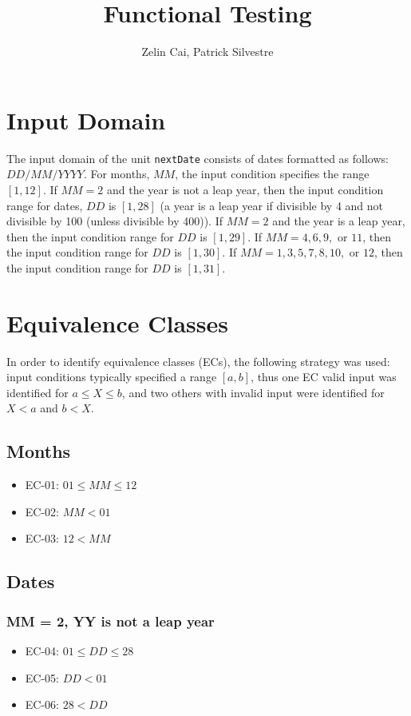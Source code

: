 \documentclass[11pt, oneside]{article}   	%
\title{Functional Testing}
\author{Zelin Cai, Patrick Silvestre}
\date{}
\begin{document}
\maketitle

\section{Input Domain}
The input domain of the unit \texttt{nextDate} consists of dates formatted as follows: $DD/MM/YYYY$. For months, $MM$, the input condition specifies the range $[1, 12]$. If $MM = 2$ and the year is not a leap year, then the input condition range for dates, $DD$ is $[1, 28]$ (a year is a leap year if divisible by 4 and not divisible by 100 (unless divisible by 400)). If $MM = 2$  and the year is a leap year, then the input condition range for $DD$ is $[1, 29]$. If $MM = 4, 6, 9,$ or $11$, then the input condition range for $DD$ is $[1, 30]$. If $MM = 1, 3, 5, 7, 8, 10,$ or $12$, then the input condition range for $DD$ is $[1, 31]$.

\section{Equivalence Classes}
In order to identify equivalence classes (ECs), the following strategy was used: input conditions typically specified a range $[a, b]$, thus one EC valid input was identified for $a \leq X \leq b$, and two others with invalid input were identified for $X < a$ and $b < X$.

\subsection{Months}
	\begin{itemize}
		\item{EC-01: $01 \leq MM \leq 12$}
		\item{EC-02: $MM < 01$}
		\item{EC-03: $12 < MM$}
	\end{itemize}

\subsection{Dates}
\subsubsection{MM = 2, YY is not a leap year}
	\begin{itemize}
		\item{EC-04: $01 \leq DD \leq 28$}
		\item{EC-05: $DD < 01$}
		\item{EC-06: $28 < DD$}
	\end{itemize}
\end{document}

